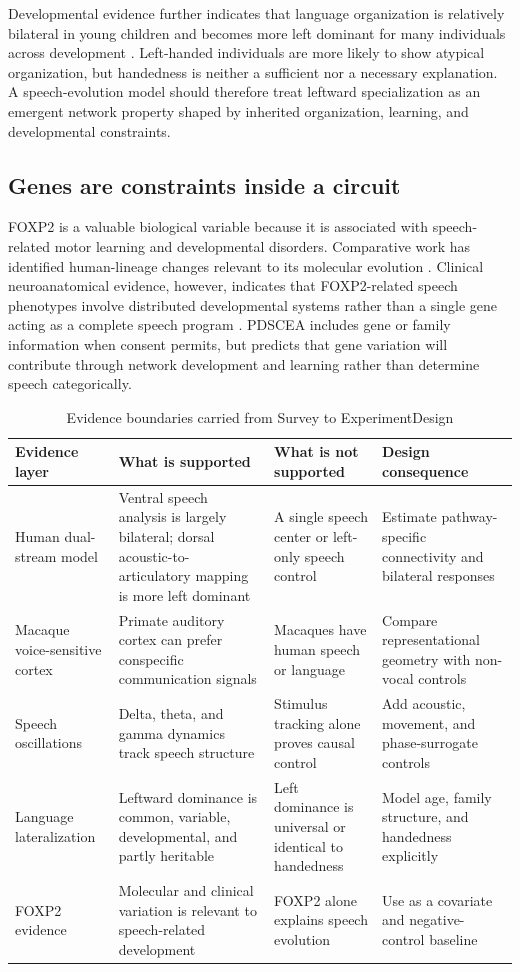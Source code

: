 \documentclass[conference]{IEEEtran}
\begin{document}
Developmental evidence further indicates that language organization is relatively bilateral in young children and becomes more left dominant for many individuals across development \cite{skeide2016}. Left-handed individuals are more likely to show atypical organization, but handedness is neither a sufficient nor a necessary explanation. A speech-evolution model should therefore treat leftward specialization as an emergent network property shaped by inherited organization, learning, and developmental constraints.

\subsection{Genes are constraints inside a circuit}

FOXP2 is a valuable biological variable because it is associated with speech-related motor learning and developmental disorders. Comparative work has identified human-lineage changes relevant to its molecular evolution \cite{enard2002}. Clinical neuroanatomical evidence, however, indicates that FOXP2-related speech phenotypes involve distributed developmental systems rather than a single gene acting as a complete speech program \cite{varghakhadem2005}. PDSCEA includes gene or family information when consent permits, but predicts that gene variation will contribute through network development and learning rather than determine speech categorically.

\begin{table}[t]
\caption{Evidence boundaries carried from Survey to ExperimentDesign}
\label{tab:evidence}
\centering
\scriptsize
\setlength{\tabcolsep}{2pt}
\begin{tabular}{p{}p{}p{}p{}}
\toprule
Evidence layer & What is supported & What is not supported & Design consequence \\
\midrule
Human dual-stream model & Ventral speech analysis is largely bilateral; dorsal acoustic-to-articulatory mapping is more left dominant & A single speech center or left-only speech control & Estimate pathway-specific connectivity and bilateral responses \\
Macaque voice-sensitive cortex & Primate auditory cortex can prefer conspecific communication signals & Macaques have human speech or language & Compare representational geometry with non-vocal controls \\
Speech oscillations & Delta, theta, and gamma dynamics track speech structure & Stimulus tracking alone proves causal control & Add acoustic, movement, and phase-surrogate controls \\
Language lateralization & Leftward dominance is common, variable, developmental, and partly heritable & Left dominance is universal or identical to handedness & Model age, family structure, and handedness explicitly \\
FOXP2 evidence & Molecular and clinical variation is relevant to speech-related development & FOXP2 alone explains speech evolution & Use as a covariate and negative-control baseline \\
\bottomrule
\end{tabular}
\end{table}
\end{document}
